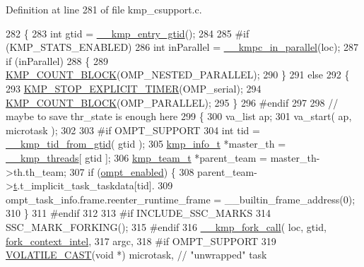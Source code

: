 Definition at line 281 of file kmp\-\_\-csupport.\-c.


\begin{DoxyCode}
282 \{
283   \textcolor{keywordtype}{int}         gtid = \hyperlink{kmp_8h_a5d1e6d7c35de87705193f11d65457229}{\_\_kmp\_entry\_gtid}();
284 
285 \textcolor{preprocessor}{#if (KMP\_STATS\_ENABLED)  }
286 \textcolor{preprocessor}{}  \textcolor{keywordtype}{int} inParallel = \hyperlink{group__THREAD__STATES_ga5c4aad6e2e289283e9c58031f7c4e228}{\_\_kmpc\_in\_parallel}(loc);
287   \textcolor{keywordflow}{if} (inParallel)
288   \{
289       \hyperlink{group__STATS__GATHERING_ga7fa64ec62947bf0b97f3f4778dd22196}{KMP\_COUNT\_BLOCK}(OMP\_NESTED\_PARALLEL);
290   \}
291   \textcolor{keywordflow}{else}
292   \{
293       \hyperlink{group__STATS__GATHERING_ga6e4f12c6bec4068d72ef9e84516ad01d}{KMP\_STOP\_EXPLICIT\_TIMER}(OMP\_serial);
294       \hyperlink{group__STATS__GATHERING_ga7fa64ec62947bf0b97f3f4778dd22196}{KMP\_COUNT\_BLOCK}(OMP\_PARALLEL);
295   \}
296 \textcolor{preprocessor}{#endif}
297 \textcolor{preprocessor}{}
298   \textcolor{comment}{// maybe to save thr\_state is enough here}
299   \{
300     va\_list     ap;
301     va\_start(   ap, microtask );
302 
303 \textcolor{preprocessor}{#if OMPT\_SUPPORT}
304 \textcolor{preprocessor}{}    \textcolor{keywordtype}{int} tid = \hyperlink{kmp_8h_afb8f84fff9682417eb1c484ffbfdc6ee}{\_\_kmp\_tid\_from\_gtid}( gtid );
305     \hyperlink{kmp_8h_a194859801fe16b326efe34501a37c30a}{kmp\_info\_t} *master\_th = \hyperlink{kmp_8h_a8ba907eb5a2568ff55a49a1504cd3624}{\_\_kmp\_threads}[ gtid ];
306     \hyperlink{unionkmp__team}{kmp\_team\_t} *parent\_team = master\_th->th.th\_team;
307     \textcolor{keywordflow}{if} (\hyperlink{ompt-general_8c_a966b31b6d05f79f5495f8d8e71732f68}{ompt\_enabled}) \{
308        parent\_team->\hyperlink{unionkmp__team_a87cf4571108a61b446e809094f8c0362}{t}.t\_implicit\_task\_taskdata[tid].
309            ompt\_task\_info.frame.reenter\_runtime\_frame = \_\_builtin\_frame\_address(0);
310     \}
311 \textcolor{preprocessor}{#endif}
312 \textcolor{preprocessor}{}
313 \textcolor{preprocessor}{#if INCLUDE\_SSC\_MARKS}
314 \textcolor{preprocessor}{}    SSC\_MARK\_FORKING();
315 \textcolor{preprocessor}{#endif}
316 \textcolor{preprocessor}{}    \hyperlink{kmp_8h_afa300d153a7fea1038d2cdc72db06498}{\_\_kmp\_fork\_call}( loc, gtid, \hyperlink{kmp_8h_a49ed6f7454c18058b488af399cadd8e0aae2ae74f371252ae8c8bb7ec81d6a38a}{fork\_context\_intel},
317             argc,
318 #\textcolor{keywordflow}{if} OMPT\_SUPPORT
319             \hyperlink{kmp__os_8h_aaa9e2fb88f003bd3a22795aadf723e53}{VOLATILE\_CAST}(\textcolor{keywordtype}{void} *) microtask,      \textcolor{comment}{// "unwrapped" task}

\end{DoxyCode}

